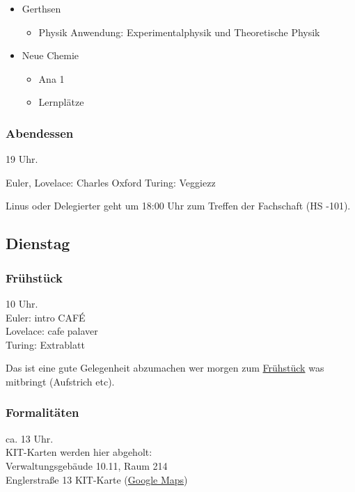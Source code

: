\documentclass[10pt,ngerman]{scrartcl}
\begin{document}
\begin{multicols}{2}
\begin{itemize}
\begin{itemize}
        \end{itemize}
    \item Gerthsen
        \begin{itemize}
            \item Physik Anwendung: Experimentalphysik und Theoretische Physik
        \end{itemize}
    \item Neue Chemie
        \begin{itemize}
            \item Ana 1
            \item Lernplätze
        \end{itemize}
\end{itemize}

\subsubsection{Abendessen}

19 Uhr.

Euler, Lovelace: Charles Oxford
Turing: Veggiezz

Linus oder Delegierter geht um 18:00 Uhr zum Treffen der Fachschaft (HS -101).



\subsection{Dienstag}

\subsubsection{Frühstück}

10 Uhr. \\
Euler: intro CAFÉ \\
Lovelace: cafe palaver \\
Turing: Extrablatt

Das ist eine gute Gelegenheit abzumachen wer morgen zum \hyperref[]{Frühstück} was mitbringt (Aufstrich etc).

\subsubsection{Formalitäten}

ca. 13 Uhr. \\
KIT-Karten werden hier abgeholt: \\
Verwaltungsgebäude 10.11, Raum 214 \\
Englerstraße 13 KIT-Karte
(\href{https://goo.gl/maps/qhAjKJah3wpiFEzq5}{Google Maps})


\end{multicols}
\end{document}
